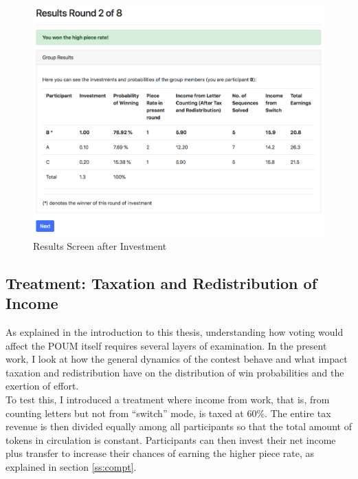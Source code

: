     \begin{figure}[h!]
        \centering
        \includegraphics[scale = 0.4]{graphs/screen_results.png}
        \caption{Results Screen after Investment}
        \label{fig:screen_results}
    \end{figure}
    
    \vspace{-2mm}
    
    \subsection{Treatment: Taxation and Redistribution of Income}
    \label{sec:treat}
    
    As explained in the introduction to this thesis, understanding how voting would affect the POUM itself requires several layers of examination. In the present work, I look at how the general dynamics of the contest behave and what impact taxation and redistribution have on the distribution of win probabilities and the exertion of effort.\\
    
    To test this, I introduced a treatment where income from work, that is, from counting letters but not from ``switch'' mode, is taxed at 60\%. The entire tax revenue is then divided equally among all participants so that the total amount of tokens in circulation is constant. Participants can then invest their net income plus transfer to increase their chances of earning the higher piece rate, as explained in section \ref{ss:compt}.\\
    
